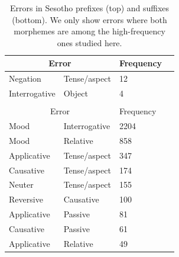 \begin{table} %
    \centering
    \begin{tabular}{ll|ll}
    \multicolumn{2}{c|}{Error} & Frequency \\ \hline\hline
    Negation & Tense/aspect & 12 \\
Interrogative & Object & 4 \\
\\
    \multicolumn{2}{c|}{Error} & Frequency \\ \hline\hline
Mood & Interrogative & 2204 \\
Mood & Relative & 858 \\
Applicative & Tense/aspect & 347 \\
Causative & Tense/aspect & 174 \\
Neuter & Tense/aspect & 155 \\
Reversive & Causative & 100 \\
Applicative & Passive & 81 \\
Causative & Passive & 61 \\
Applicative & Relative & 49 \\
\end{tabular}
    \caption{Errors in Sesotho prefixes (top) and suffixes (bottom).
    We only show errors where both morphemes are among the high-frequency ones studied here.}
    \label{tab:sesotho-prefix-err-analysis}
\end{table}






